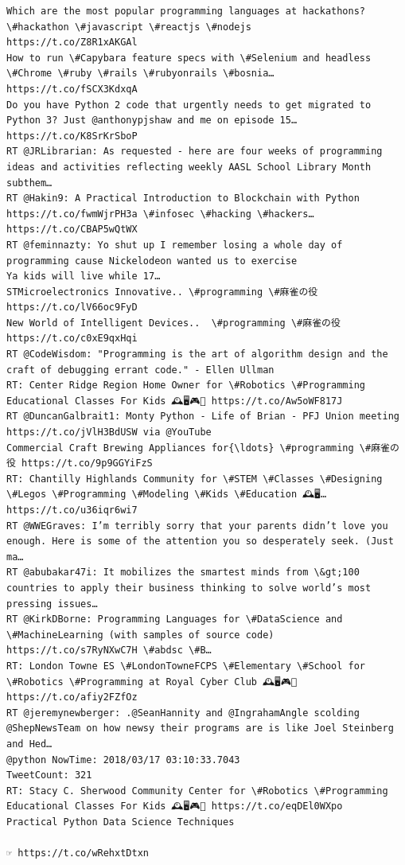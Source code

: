 \documentclass[11pt]{article}
\begin{document}
\begin{Verbatim}[commandchars=\\\{\}]
Which are the most popular programming languages at hackathons? \#hackathon \#javascript \#reactjs \#nodejs
https://t.co/Z8R1xAKGAl
How to run \#Capybara feature specs with \#Selenium and headless \#Chrome \#ruby \#rails \#rubyonrails \#bosnia… https://t.co/fSCX3KdxqA
Do you have Python 2 code that urgently needs to get migrated to Python 3? Just @anthonypjshaw and me on episode 15… https://t.co/K8SrKrSboP
RT @JRLibrarian: As requested - here are four weeks of programming ideas and activities reflecting weekly AASL School Library Month subthem…
RT @Hakin9: A Practical Introduction to Blockchain with Python https://t.co/fwmWjrPH3a \#infosec \#hacking \#hackers… https://t.co/CBAP5wQtWX
RT @feminnazty: Yo shut up I remember losing a whole day of programming cause Nickelodeon wanted us to exercise 
Ya kids will live while 17…
STMicroelectronics Innovative.. \#programming \#麻雀の役  https://t.co/lV66oc9FyD
New World of Intelligent Devices..  \#programming \#麻雀の役 https://t.co/c0xE9qxHqi
RT @CodeWisdom: "Programming is the art of algorithm design and the craft of debugging errant code." - Ellen Ullman
RT: Center Ridge Region Home Owner for \#Robotics \#Programming Educational Classes For Kids 🕰️🖥️🎮💎 https://t.co/Aw5oWF817J
RT @DuncanGalbrait1: Monty Python - Life of Brian - PFJ Union meeting https://t.co/jVlH3BdUSW via @YouTube
Commercial Craft Brewing Appliances for{\ldots} \#programming \#麻雀の役 https://t.co/9p9GGYiFzS
RT: Chantilly Highlands Community for \#STEM \#Classes \#Designing \#Legos \#Programming \#Modeling \#Kids \#Education 🕰️🖥️… https://t.co/u36iqr6wi7
RT @WWEGraves: I’m terribly sorry that your parents didn’t love you enough. Here is some of the attention you so desperately seek. (Just ma…
RT @abubakar47i: It mobilizes the smartest minds from \&gt;100 countries to apply their business thinking to solve world’s most pressing issues…
RT @KirkDBorne: Programming Languages for \#DataScience and \#MachineLearning (with samples of source code) https://t.co/s7RyNXwC7H \#abdsc \#B…
RT: London Towne ES \#LondonTowneFCPS \#Elementary \#School for \#Robotics \#Programming at Royal Cyber Club 🕰️🖥️🎮💎 https://t.co/afiy2FZfOz
RT @jeremynewberger: .@SeanHannity and @IngrahamAngle scolding @ShepNewsTeam on how newsy their programs are is like Joel Steinberg and Hed…
@python NowTime: 2018/03/17 03:10:33.7043
TweetCount: 321
RT: Stacy C. Sherwood Community Center for \#Robotics \#Programming Educational Classes For Kids 🕰️🖥️🎮💎 https://t.co/eqDEl0WXpo
Practical Python Data Science Techniques

☞ https://t.co/wRehxtDtxn


\end{Verbatim}
\end{document}
